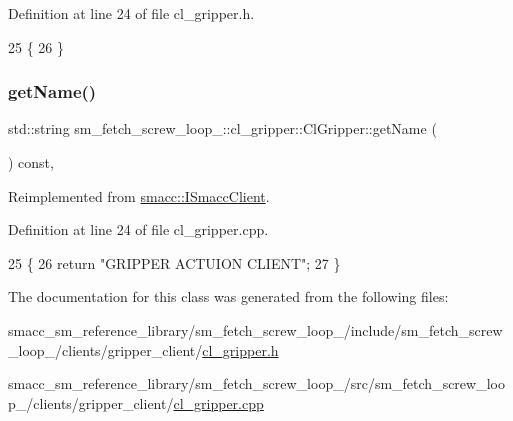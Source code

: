 Definition at line 24 of file cl\+\_\+gripper.\+h.


\begin{DoxyCode}
25   \{
26   \}
\end{DoxyCode}
\mbox{\label{classsm__fetch__screw__loop__1_1_1cl__gripper_1_1ClGripper_a4ccd942c59f65959af1d2c54253fd3f2}} 
\subsubsection{\texorpdfstring{get\+Name()}{getName()}}
{\footnotesize\ttfamily std\+::string sm\+\_\+fetch\+\_\+screw\+\_\+loop\+\_\+::cl\+\_\+gripper\+::\+Cl\+Gripper\+::get\+Name (\begin{DoxyParamCaption}{ }\end{DoxyParamCaption}) const\hspace{0.3cm}{\ttfamily [override]}, {\ttfamily [virtual]}}



Reimplemented from \hyperlink{classsmacc_1_1ISmaccClient_a8c3ce19f182e71909c5dc6263d25be69}{smacc\+::\+I\+Smacc\+Client}.



Definition at line 24 of file cl\+\_\+gripper.\+cpp.


\begin{DoxyCode}
25 \{
26     \textcolor{keywordflow}{return} \textcolor{stringliteral}{"GRIPPER ACTUION CLIENT"};
27 \}
\end{DoxyCode}


The documentation for this class was generated from the following files\+:\begin{DoxyCompactItemize}
\item 
smacc\+\_\+sm\+\_\+reference\+\_\+library/sm\+\_\+fetch\+\_\+screw\+\_\+loop\+\_/include/sm\+\_\+fetch\+\_\+screw\+\_\+loop\+\_/clients/gripper\+\_\+client/\hyperlink{sm__fetch__screw__loop__1_2include_2sm__fetch__screw__loop__1_2clients_2gripper__client_2cl__gripper_8h}{cl\+\_\+gripper.\+h}\item 
smacc\+\_\+sm\+\_\+reference\+\_\+library/sm\+\_\+fetch\+\_\+screw\+\_\+loop\+\_/src/sm\+\_\+fetch\+\_\+screw\+\_\+loop\+\_/clients/gripper\+\_\+client/\hyperlink{sm__fetch__screw__loop__1_2src_2sm__fetch__screw__loop__1_2clients_2gripper__client_2cl__gripper_8cpp}{cl\+\_\+gripper.\+cpp}\end{DoxyCompactItemize}
